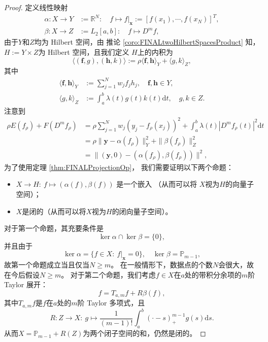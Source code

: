 \begin{proof}
  定义线性映射
\begin{align*}
  \alpha:X\to Y&:=\mathbb{R}^{N}:\quad
                 f\mapsto f|_{\mathbf{x}}:=
                 [f(x_{1}),\cdots,f(x_{N})]^{T},\\
  \beta:X\to Z&:=L_{2}[a,b]:\quad
                f\mapsto D^{m}f,
\end{align*}
由于$Y$和$Z$均为 Hilbert 空间，由
推论 \ref{coro:FINALtwoHilbertSpacesProduct} 知，
$H:=Y\times Z$为 Hilbert 空间，且我们定义
$H$上的内积为
\begin{displaymath}
  \langle (\mathbf{f},g),(\mathbf{h},k)\rangle
  :=\rho\langle \mathbf{f},\mathbf{h}\rangle_{Y}
  +\langle g,k\rangle_{Z},
\end{displaymath}
其中
\begin{align*}
  \langle \mathbf{f},\mathbf{h}\rangle_{Y}
  &:=\sum_{j=1}^{N}w_{j}f_{j}h_{j},
    \quad \mathbf{f},\mathbf{h}\in Y,\\
  \langle g,k\rangle_{Z}&:=\int_{a}^{b}\lambda(t) g(t)k(t)\mathrm{d}t,
                          \quad g,k\in Z.
\end{align*}
注意到
\begin{align*}
  \rho E(f_{\rho})+F(D^{m}f_{\rho})
  &=\rho\sum_{j=1}^{N}w_{j}(y_{j}-f_{\rho}(x_{j}))^{2}
    +\int_{a}^{b}\lambda(t)|D^{m}f_{\rho}(t)|^{2}\mathrm{d}t\\
  &=\rho\|\mathbf{y}-\alpha(f_{\rho})\|_{Y}^{2}
    +\|\beta(f_{\rho})\|_{Z}^{2}\\
  &=\|(\mathbf{y},0)-(\alpha(f_{\rho}),\beta(f_{\rho}))\|^{2},
\end{align*}
为了使用定理 \ref{thm:FINALProjectionOp}，
我们需要证明以下两个命题：
\begin{itemize}
\item $ X\to H:\ f\mapsto \left(\alpha(f),\beta(f)\right)$ 是一个嵌入
  （从而可以将 $X$视为$H$的向量子空间）；
  \item $X$是闭的（从而可以将$X$视为$H$的闭向量子空间）。
\end{itemize}
对于第一个命题，其充要条件是
\begin{displaymath}
  \ker\alpha \cap \ker \beta=\{0\},
\end{displaymath}
并且由于
\begin{displaymath}
  \ker\alpha =\{f\in X:\ f|_{\mathbf{x}}=0\},\quad
  \ker \beta=\mathbb{P}_{m-1},
\end{displaymath}
故第一个命题成立当且仅当$N\ge m$。
在一般情形下，数据点的个数$N$会很大，故在今后假设$N\ge m$。
对于第二个命题，我们考虑$f\in X$在$a$处的带积分余项的$m$阶 Taylor 展开：
\begin{equation}
  \label{eq:FINALstandardRepresentationX}
  f=T_{a,m}f+R\beta(f),
\end{equation}
其中$T_{a,m}f$是$f$在$a$处的$m$阶 Taylor 多项式，且
\begin{displaymath}
  R:Z\to X:\
  g\mapsto \frac{1}{(m-1)!}
  \int_{a}^{b}(\cdot -s)^{m-1}_{+}g(s)\mathrm{d}s.
\end{displaymath}
从而$X=\mathbb{P}_{m-1}+R(Z)$为两个闭子空间的和，仍然是闭的。


\end{proof}
